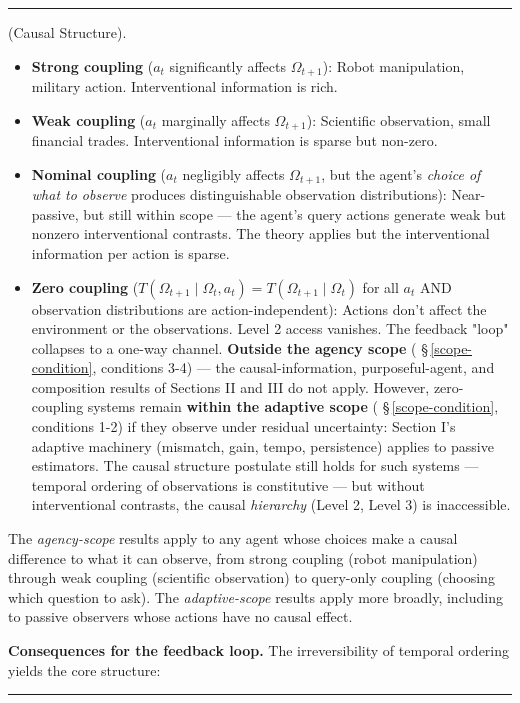 \documentclass[11pt,oneside]{article}
\newcounter{claim}[section]
\renewcommand{\theclaim}{\thesection.\arabic{claim}}
\newenvironment{segment}[2]{%
  \refstepcounter{claim}%
  \bigskip\noindent\hrule\smallskip
  \noindent{\bfseries #1~\theclaim}\enskip(#2).\par\smallskip
  \noindent\ignorespaces
}{%
  \par\smallskip\noindent\hrule\bigskip
}
\newenvironment{postulate}[1][]{\begin{segment}{Postulate}{#1}}{\end{segment}}
\begin{document}
\begin{postulate}[Causal Structure]
\begin{itemize}
  \item \textbf{Strong coupling} ($a_t$ significantly affects $\Omega_{t+1}$): Robot manipulation, military action. Interventional information is rich.
  \item \textbf{Weak coupling} ($a_t$ marginally affects $\Omega_{t+1}$): Scientific observation, small financial trades. Interventional information is sparse but non-zero.
  \item \textbf{Nominal coupling} ($a_t$ negligibly affects $\Omega_{t+1}$, but the agent's \textit{choice of what to observe} produces distinguishable observation distributions): Near-passive, but still within scope — the agent's query actions generate weak but nonzero interventional contrasts. The theory applies but the interventional information per action is sparse.
  \item \textbf{Zero coupling} ($T(\Omega_{t+1} \mid \Omega_t, a_t) = T(\Omega_{t+1} \mid \Omega_t)$ for all $a_t$ AND observation distributions are action-independent): Actions don't affect the environment or the observations. Level 2 access vanishes. The feedback "loop" collapses to a one-way channel. \textbf{Outside the agency scope} ( \S\,\ref{scope-condition}, conditions 3-4) — the causal-information, purposeful-agent, and composition results of Sections II and III do not apply. However, zero-coupling systems remain \textbf{within the adaptive scope} ( \S\,\ref{scope-condition}, conditions 1-2) if they observe under residual uncertainty: Section I's adaptive machinery (mismatch, gain, tempo, persistence) applies to passive estimators. The causal structure postulate still holds for such systems — temporal ordering of observations is constitutive — but without interventional contrasts, the causal \textit{hierarchy} (Level 2, Level 3) is inaccessible.
\end{itemize}


The \textit{agency-scope} results apply to any agent whose choices make a causal difference to what it can observe, from strong coupling (robot manipulation) through weak coupling (scientific observation) to query-only coupling (choosing which question to ask). The \textit{adaptive-scope} results apply more broadly, including to passive observers whose actions have no causal effect.

\textbf{Consequences for the feedback loop.} The irreversibility of temporal ordering yields the core structure:


\end{postulate}
\end{document}

